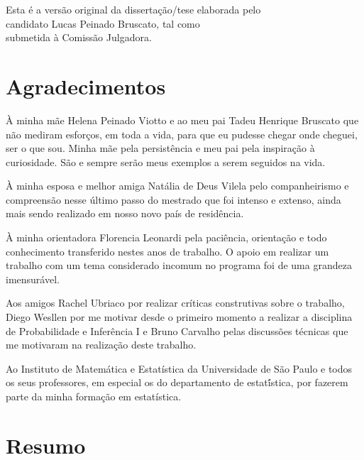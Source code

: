 \documentclass[12pt,twoside,a4paper]{book}
\begin{document}
\vskip 2cm

\begin{flushright}
    Esta é a versão original da dissertação/tese elaborada pelo\\
    candidato Lucas Peinado Bruscato, tal como\\
    submetida à Comissão Julgadora.
    
    \vskip 2cm

\end{flushright}

\vskip 4.2cm

\chapter*{Agradecimentos}

À minha mãe Helena Peinado Viotto e ao meu pai Tadeu Henrique Bruscato que não mediram esforços, em toda a vida, para que eu pudesse chegar onde cheguei, ser o que sou. Minha mãe pela persistência e meu pai pela inspiração à curiosidade. São e sempre serão meus exemplos a serem seguidos na vida.

À minha esposa e melhor amiga Natália de Deus Vilela pelo companheirismo e compreensão nesse último passo do mestrado que foi intenso e extenso, ainda mais sendo realizado em nosso novo país de residência.

À minha orientadora Florencia Leonardi pela paciência, orientação e todo conhecimento transferido nestes anos de trabalho. O apoio em realizar um trabalho com um tema considerado incomum no programa foi de uma grandeza imensurável.

Aos amigos Rachel Ubriaco por realizar críticas construtivas sobre o trabalho, Diego Wesllen por me motivar desde o primeiro momento a realizar a disciplina de Probabilidade e Inferência I e Bruno Carvalho pelas discussões técnicas que me motivaram na realização deste trabalho.

Ao Instituto de Matemática e Estatística da Universidade de São Paulo e todos os seus professores, em especial os do departamento de estatí́stica, por fazerem parte da minha formação em estatística.


\chapter*{Resumo}
\end{document}
